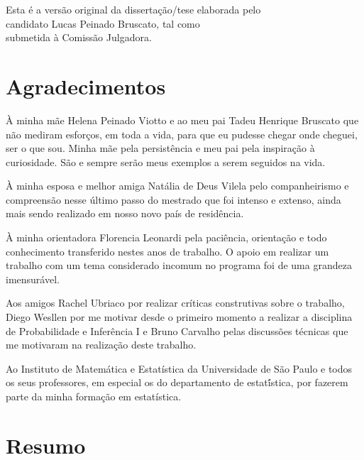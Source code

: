 \documentclass[12pt,twoside,a4paper]{book}
\begin{document}
\vskip 2cm

\begin{flushright}
    Esta é a versão original da dissertação/tese elaborada pelo\\
    candidato Lucas Peinado Bruscato, tal como\\
    submetida à Comissão Julgadora.
    
    \vskip 2cm

\end{flushright}

\vskip 4.2cm

\chapter*{Agradecimentos}

À minha mãe Helena Peinado Viotto e ao meu pai Tadeu Henrique Bruscato que não mediram esforços, em toda a vida, para que eu pudesse chegar onde cheguei, ser o que sou. Minha mãe pela persistência e meu pai pela inspiração à curiosidade. São e sempre serão meus exemplos a serem seguidos na vida.

À minha esposa e melhor amiga Natália de Deus Vilela pelo companheirismo e compreensão nesse último passo do mestrado que foi intenso e extenso, ainda mais sendo realizado em nosso novo país de residência.

À minha orientadora Florencia Leonardi pela paciência, orientação e todo conhecimento transferido nestes anos de trabalho. O apoio em realizar um trabalho com um tema considerado incomum no programa foi de uma grandeza imensurável.

Aos amigos Rachel Ubriaco por realizar críticas construtivas sobre o trabalho, Diego Wesllen por me motivar desde o primeiro momento a realizar a disciplina de Probabilidade e Inferência I e Bruno Carvalho pelas discussões técnicas que me motivaram na realização deste trabalho.

Ao Instituto de Matemática e Estatística da Universidade de São Paulo e todos os seus professores, em especial os do departamento de estatí́stica, por fazerem parte da minha formação em estatística.


\chapter*{Resumo}
\end{document}
